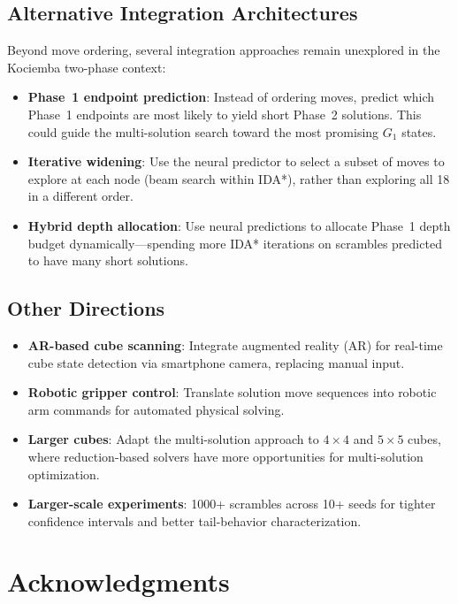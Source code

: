 \documentclass[10pt,twocolumn,a4paper]{article}
\begin{document}
\subsection{Alternative Integration Architectures}
Beyond move ordering, several integration approaches remain unexplored in the Kociemba two-phase context:

\begin{itemize}[leftmargin=*]
  \item \textbf{Phase~1 endpoint prediction}: Instead of ordering moves, predict which Phase~1 endpoints are most likely to yield short Phase~2 solutions. This could guide the multi-solution search toward the most promising $G_1$ states.
  \item \textbf{Iterative widening}: Use the neural predictor to select a subset of moves to explore at each node (beam search within IDA*), rather than exploring all 18 in a different order.
  \item \textbf{Hybrid depth allocation}: Use neural predictions to allocate Phase~1 depth budget dynamically---spending more IDA* iterations on scrambles predicted to have many short solutions.
\end{itemize}

\subsection{Other Directions}
\begin{itemize}[leftmargin=*]
  \item \textbf{AR-based cube scanning}: Integrate augmented reality (AR) for real-time cube state detection via smartphone camera, replacing manual input.
  \item \textbf{Robotic gripper control}: Translate solution move sequences into robotic arm commands for automated physical solving.
  \item \textbf{Larger cubes}: Adapt the multi-solution approach to $4{\times}4$ and $5{\times}5$ cubes, where reduction-based solvers have more opportunities for multi-solution optimization.
  \item \textbf{Larger-scale experiments}: 1000+ scrambles across 10+ seeds for tighter confidence intervals and better tail-behavior characterization.
\end{itemize}

\section*{Acknowledgments}
\end{document}
